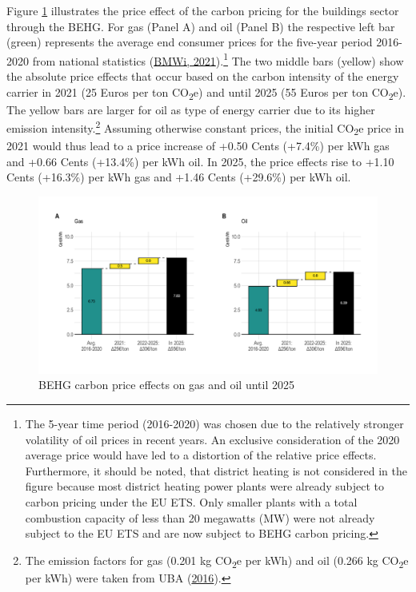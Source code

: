 \documentclass[12pt,twoside]{reedthesis}
\begin{document}
Figure \ref{fig:behg} illustrates the price effect of the carbon pricing for the buildings sector through the BEHG. For gas (Panel A) and oil (Panel B) the respective left bar (green) represents the average end consumer prices for the five-year period 2016-2020 from national statistics (\protect\hyperlink{ref-bmwi21}{BMWi, 2021}).\footnote{The 5-year time period (2016-2020) was chosen due to the relatively stronger volatility of oil prices in recent years. An exclusive consideration of the 2020 average price would have led to a distortion of the relative price effects. Furthermore, it should be noted, that district heating is not considered in the figure because most district heating power plants were already subject to carbon pricing under the EU ETS. Only smaller plants with a total combustion capacity of less than 20 megawatts (MW) were not already subject to the EU ETS and are now subject to BEHG carbon pricing.} The two middle bars (yellow) show the absolute price effects that occur based on the carbon intensity of the energy carrier in 2021 (25 Euros per ton CO\textsubscript{2}e) and until 2025 (55 Euros per ton CO\textsubscript{2}e). The yellow bars are larger for oil as type of energy carrier due to its higher emission intensity.\footnote{The emission factors for gas (0.201 kg CO\textsubscript{2}e per kWh) and oil (0.266 kg CO\textsubscript{2}e per kWh) were taken from UBA (\protect\hyperlink{ref-uba16}{2016}).} Assuming otherwise constant prices, the initial CO\textsubscript{2}e price in 2021 would thus lead to a price increase of +0.50 Cents (+7.4\%) per kWh gas and +0.66 Cents (+13.4\%) per kWh oil. In 2025, the price effects rise to +1.10 Cents (+16.3\%) per kWh gas and +1.46 Cents (+29.6\%) per kWh oil.
\begin{figure}

{\centering \includegraphics[width=1\linewidth]{figure/price_effect_behg} 

}

\caption[BEHG carbon price effects on gas and oil until 2025]{BEHG carbon price effects on gas and oil until 2025}\label{fig:behg}
\end{figure}
\end{document}
